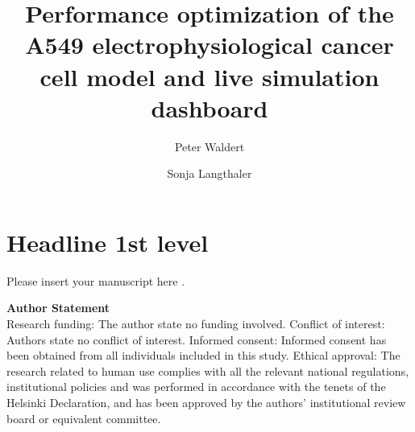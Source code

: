 \documentclass[USenglish,twocolumn]{article}
\begin{document}
  \openaccess

  \title{Performance optimization of the A549 electrophysiological cancer cell model and live simulation dashboard}

  \author*[1]{Peter Waldert}
  \author[1]{Sonja Langthaler}




  \maketitle

  \section{Headline 1st level}

  Please insert your manuscript here \cite{2021-A549-model}.

  \vspace{1cm}


  \textsf{\textbf{Author Statement}}\\
  Research funding: The author state no funding involved. Conflict of interest: Authors state no conflict of interest. Informed consent: Informed consent has been obtained from all individuals included in this study. Ethical approval: The research related to human use complies with all the relevant national regulations, institutional policies and was performed in accordance with the tenets of the Helsinki Declaration, and has been approved by the authors' institutional review board or equivalent committee.

  \printbibliography
\end{document}
